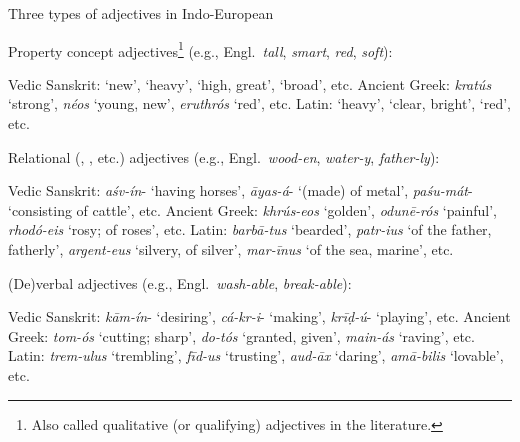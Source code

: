 \documentclass[output=paper,colorlinks,citecolor=brown]{langscibook}
\begin{document}
\begin{exe}
    \ex Three types of adjectives in Indo-European \label{ex:adj}
    \begin{xlist}
        \ex Property concept adjectives\footnote{Also called qualitative (or qualifying) adjectives in the literature.} (e.g., Engl.\  \textit{tall}, \textit{smart}, \textit{red}, \textit{soft}): \label{ex:adj1}
        \begin{xlist}
            \ex Vedic Sanskrit:  `new',  `heavy',  `high, great', \newline {} `broad', etc.
            \ex Ancient Greek: \textit{kratús} `strong', \textit{néos} `young, new', \textit{eruthrós} `red', etc.
            \ex Latin:  `heavy',  `clear, bright',  `red', etc.
        \end{xlist}
        \item Relational (, , etc.) adjectives  (e.g., Engl.\ \textit{wood-en}, \textit{water-y}, \textit{father-ly}):  \label{ex:adj2}
        \begin{xlist}
             \ex Vedic Sanskrit: \textit{aśv-ín}-  `having horses', \textit{āyas-á}-  `(made) of metal', \textit{paśu-mát}-  `consisting of cattle', etc.
            \ex Ancient Greek: \textit{khrús-eos} `golden',  \textit{odunē-rós} `painful', \textit{rhodó-eis}   `rosy; of roses', etc.
            \ex Latin: \textit{barbā-tus}  `bearded', \textit{patr-ius}   `of the father, fatherly', \textit{argent-eus}  `silvery, of silver', \textit{mar-īnus}  `of the sea, marine', etc.
        \end{xlist}
        \item (De)verbal adjectives (e.g., Engl.\  \textit{wash-able}, \textit{break-able}): \label{ex:adj3}
              \begin{xlist}
             \ex Vedic Sanskrit: \textit{kām-ín}-   `desiring', \textit{cá-kr-i}-  `making', \textit{krīḍ-ú}-  `playing', etc.
            \ex Ancient Greek: \textit{tom-ós} `cutting; sharp', \textit{do-tós}  `granted, given', \textit{main-ás}  `raving', etc.
            \ex Latin: \textit{trem-ulus}  `trembling', \textit{fīd-us}   `trusting', \textit{aud-āx}   `daring', \textit{amā-bilis}  `lovable', etc.
        \end{xlist}
    \end{xlist}
\end{exe}
\end{document}
